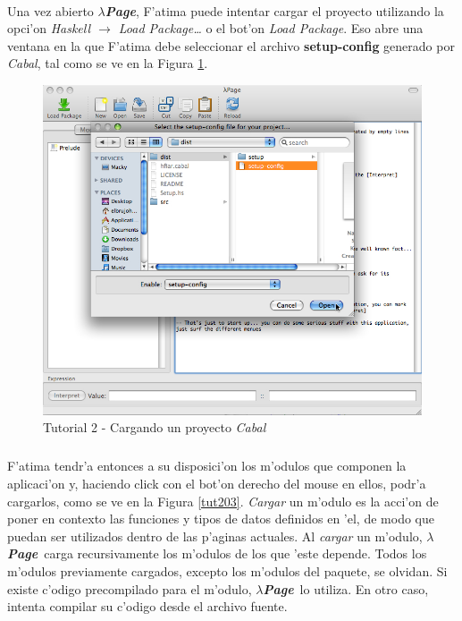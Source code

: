 \documentclass[a4paper]{article}
\newcommand{\hpage}{\textbf{\textsl{$\lambda$Page}}}
\newcommand{\cabal}{\textsl{Cabal}}
\begin{document}
\paragraph{}Una vez abierto \hpage, F'atima puede intentar cargar el proyecto utilizando la opci'on \textsl{Haskell $\rightarrow$ Load Package\ldots} o el bot'on \textsl{Load Package}.  Eso abre una ventana en la que F'atima debe seleccionar el archivo \textbf{setup-config} generado por \cabal, tal como se ve en la Figura \ref{tut202}.
\begin{figure}[hp]
	\begin{center}
        	\includegraphics[width=.75\textwidth]{pictures/tut2/02}
		\caption{Tutorial 2 - Cargando un proyecto \cabal}
		\label{tut202}
	\end{center}
\end{figure}
\subparagraph{}F'atima tendr'a entonces a su disposici'on los m'odulos que componen la aplicaci'on y, haciendo click con el bot'on derecho del mouse en ellos, podr'a cargarlos, como se ve en la Figura \ref{tut203}.  \textsl{Cargar} un m'odulo es la acci'on de poner en contexto las funciones y tipos de datos definidos en 'el, de modo que puedan ser utilizados dentro de las p'aginas actuales.  Al \textsl{cargar} un m'odulo, \hpage\ carga recursivamente los m'odulos de los que 'este depende.  Todos los m'odulos previamente cargados, excepto los m'odulos del paquete, se olvidan.  Si existe c'odigo precompilado para el m'odulo, \hpage\ lo utiliza.  En otro caso, intenta compilar su c'odigo desde el archivo fuente.
\end{document}
